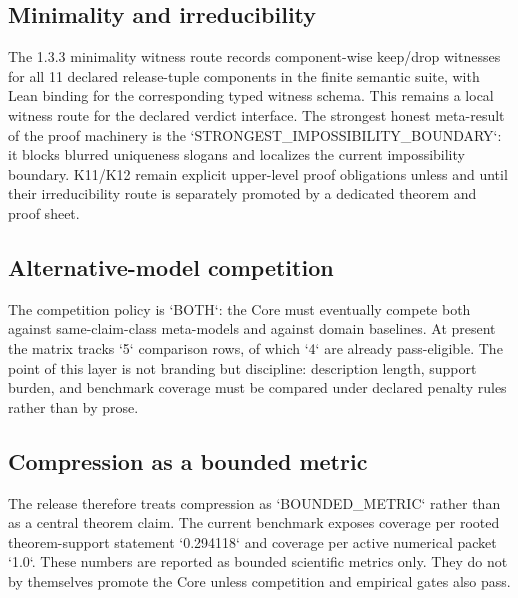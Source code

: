 \subsection{Minimality and irreducibility}
The 1.3.3 minimality witness route records component-wise keep/drop witnesses for all 11 declared release-tuple components in the finite semantic suite, with Lean binding for the corresponding typed witness schema.
This remains a local witness route for the declared verdict interface. The strongest honest meta-result of the proof machinery is the `STRONGEST\_IMPOSSIBILITY\_BOUNDARY`: it blocks blurred uniqueness slogans and localizes the current impossibility boundary. K11/K12 remain explicit upper-level proof obligations unless and until their irreducibility route is separately promoted by a dedicated theorem and proof sheet.

\subsection{Alternative-model competition}
The competition policy is `BOTH`: the Core must eventually compete both against same-claim-class meta-models and against domain baselines.
At present the matrix tracks `5` comparison rows, of which `4` are already pass-eligible.
The point of this layer is not branding but discipline: description length, support burden, and benchmark coverage must be compared under declared penalty rules rather than by prose.

\subsection{Compression as a bounded metric}
The release therefore treats compression as `BOUNDED\_METRIC` rather than as a central theorem claim.
The current benchmark exposes coverage per rooted theorem-support statement `0.294118` and coverage per active numerical packet `1.0`.
These numbers are reported as bounded scientific metrics only. They do not by themselves promote the Core unless competition and empirical gates also pass.
